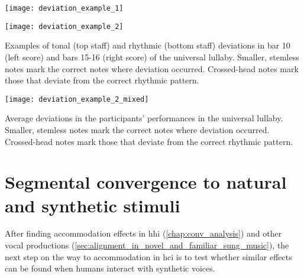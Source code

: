 \begin{snippet}[t]
	\begin{minipage}{.41\linewidth}
		\centering
		\texttt{[image: deviation\_example\_1]}
		\label{fig:deviation_example_1}
	\end{minipage}%
	\hfill
	\begin{minipage}{.49\linewidth}
		\centering
		\texttt{[image: deviation\_example\_2]}
		\label{fig:deviation_example_2}
	\end{minipage}%
	\caption[Examples of tonal and rhythmic deviations]
		{Examples of tonal (top staff) and rhythmic (bottom staff) deviations in bar 10 (left score) and bars 15-16 (right score) of the universal lullaby.
		Smaller, stemless notes mark the correct notes where deviation occurred.
		Crossed-head notes mark those that deviate from the correct rhythmic pattern.}
\end{snippet}

\begin{snippet}[t]
	\centering
	\texttt{[image: deviation\_example\_2\_mixed]}
	\caption[Average tonal and rhythmic deviations]
		{Average deviations in the participants' performances in the universal lullaby.
		Smaller, stemless notes mark the correct notes where deviation occurred.
		Crossed-head notes mark those that deviate from the correct rhythmic pattern.}
	\label{snippet:deviation_example}
\end{snippet}

\section{Segmental convergence to natural and synthetic stimuli}
\label{sec:convergence_to_natural_and_synthetic_stimuli}


After finding accommodation effects in \ac{hhi} (\cref{chap:conv_analysis}) and other vocal productions (\cref{sec:alignment_in_novel_and_familiar_sung_music}), the next step on the way to accommodation in \ac{hci} is to test whether similar effects can be found when humans interact with synthetic voices.

